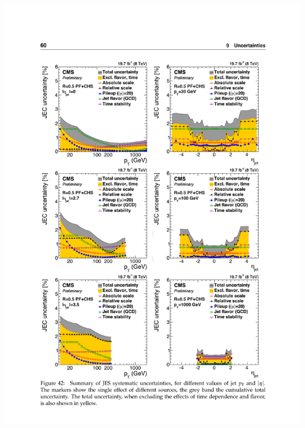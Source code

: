 {\begin{columns}
\begin{column}{0.65\textwidth}
      \includegraphics[width=\textwidth]{images/plot_unc.pdf}
    \end{column}
  \end{columns}
  
}
